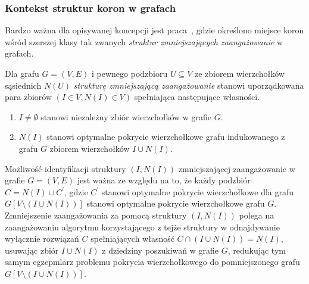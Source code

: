 \subsubsection{\textbf{Kontekst struktur koron w grafach}}
\label{sss_kernelization_crown_context}
\par{
  Bardzo ważna dla opisywanej koncepcji jest praca~\cite{chlebik:crown}, gdzie określono miejsce koron wśród szerszej klasy tak zwanych \emph{struktur zmniejszających zaangażowanie} w grafach.
  \begin{definition}
    Dla grafu $G=(V, E)$ i pewnego podzbioru $U \subseteq V$ ze zbiorem wierzchołków sąsiednich $N(U)$ \emph{strukturę zmniejszającą zaangażowanie} stanowi uporządkowana para zbiorów $(I \in V, N(I) \in V)$ spełniająca następujące własności.
    \begin{enumerate}
      \item $I \neq \emptyset$ stanowi niezależny zbiór wierzchołków w grafie $G$.
      \item $N(I)$ stanowi optymalne pokrycie wierzchołkowe grafu indukowanego z grafu $G$ zbiorem wierzchołków $I \cup N(I)$.
    \end{enumerate}
  \end{definition}
  Możliwość identyfikacji struktury $(I, N(I))$ zmniejszającej zaangażowanie w grafie $G=(V, E)$ jest ważna ze względu na to, że każdy podzbiór $C=N(I)\cup C^\prime$, gdzie $C^\prime$ stanowi optymalne pokrycie wierzchołkowe dla grafu $G[V \setminus (I\cup N(I))]$ stanowi optymalne pokrycie wierzchołkowe grafu $G$.
  Zmniejszenie zaangażowania za pomocą struktury $(I, N(I))$ polega na zaangażowaniu algorytmu korzystającego z tejże struktury w odnajdywanie wyłącznie rozwiązań $C$ spełniających własność $C \cap (I \cup N(I)) = N(I)$, usuwając zbiór $I \cup N(I)$ z dziedziny poszukiwań w grafie $G$, redukując tym samym egzepmlarz problemu pokrycia wierzchołkowego do pomniejszonego grafu $G[V \setminus (I \cup N(I))]$.
}
